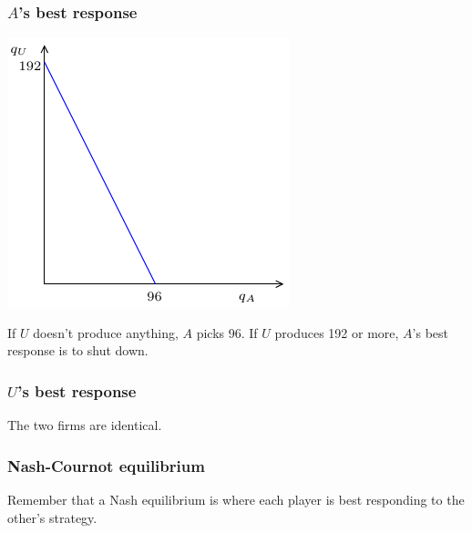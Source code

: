 \documentclass[xcolor=pdftex,dvipsnames]{beamer}
\begin{document}
\begin{frame}
  \frametitle{$A$'s best response }
  \begin{center}
    \includegraphics{pics/Cournot1}
  \end{center}
If $U$ doesn't produce anything, $A$ picks 96. If $U$ produces 192 or
more, $A$'s best response is to shut down.
\end{frame}

\begin{frame}
  \frametitle{$U$'s best response}
  The two firms are identical. 





\end{frame}

\begin{frame}
  \frametitle{Nash-Cournot equilibrium}
  Remember that a Nash equilibrium is where each player is best
responding to the other's strategy.

\bigskip
{}




\end{frame}
\end{document}
